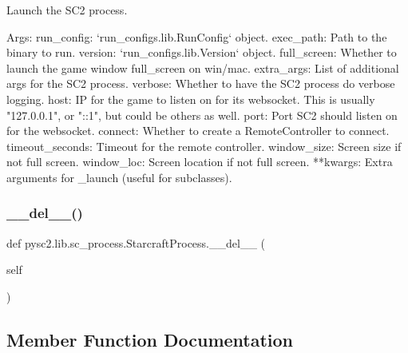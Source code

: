 \begin{DoxyVerb}Launch the SC2 process.

Args:
  run_config: `run_configs.lib.RunConfig` object.
  exec_path: Path to the binary to run.
  version: `run_configs.lib.Version` object.
  full_screen: Whether to launch the game window full_screen on win/mac.
  extra_args: List of additional args for the SC2 process.
  verbose: Whether to have the SC2 process do verbose logging.
  host: IP for the game to listen on for its websocket. This is
  usually "127.0.0.1", or "::1", but could be others as well.
  port: Port SC2 should listen on for the websocket.
  connect: Whether to create a RemoteController to connect.
  timeout_seconds: Timeout for the remote controller.
  window_size: Screen size if not full screen.
  window_loc: Screen location if not full screen.
  **kwargs: Extra arguments for _launch (useful for subclasses).
\end{DoxyVerb}
 \mbox{\label{classpysc2_1_1lib_1_1sc__process_1_1_starcraft_process_a2ea4b975a739f0580d91403fe35bc0f1}} 
\subsubsection{\texorpdfstring{\+\_\+\+\_\+del\+\_\+\+\_\+()}{\_\_del\_\_()}}
{\footnotesize\ttfamily def pysc2.\+lib.\+sc\+\_\+process.\+Starcraft\+Process.\+\_\+\+\_\+del\+\_\+\+\_\+ (\begin{DoxyParamCaption}\item[{}]{self }\end{DoxyParamCaption})}



\subsection{Member Function Documentation}
\mbox{\label{classpysc2_1_1lib_1_1sc__process_1_1_starcraft_process_a3cdbe783d29d2863ba10ec403cb16e30}} 
